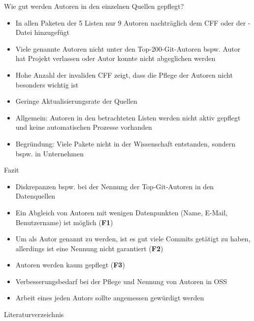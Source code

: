 \documentclass[%
    handout,
    aspectratio=1610,
    10pt,
    onlytextwidth, %
]{beamer}
\begin{document}
\begin{frame}{Wie gut werden Autoren in den einzelnen Quellen gepflegt?}
    \begin{itemize}
        \item In allen Paketen der 5 Listen nur 9 Autoren nachträglich dem CFF oder der -Datei hinzugefügt
        \item Viele genannte Autoren nicht unter den Top-200-Git-Autoren bspw. Autor hat Projekt verlassen oder Autor konnte nicht abgeglichen werden
        \item Hohe Anzahl der invaliden CFF zeigt, dass die Pflege der Autoren nicht besonders wichtig ist
        \item Geringe Aktualisierungsrate der Quellen
        \item Allgemein: Autoren in den betrachteten Listen werden nicht aktiv gepflegt und keine automatischen Prozesse vorhanden
        \item Begründung: Viele Pakete nicht in der Wissenschaft entstanden, sondern bspw. in Unternehmen %
    \end{itemize}
\end{frame}

\begin{frame}{Fazit}
    \begin{itemize}
        \item Diskrepanzen bspw. bei der Nennung der Top-Git-Autoren in den Datenquellen
        \item Ein Abgleich von Autoren mit wenigen Datenpunkten (Name, E-Mail, Benutzername) ist möglich (\textcolor{links}{\textbf{F1}})
        \item Um als Autor genannt zu werden, ist es gut viele Commits getätigt zu haben, allerdings ist eine Nennung nicht garantiert (\textcolor{links}{\textbf{F2}})
        \item Autoren werden kaum gepflegt (\textcolor{links}{\textbf{F3}})
        \item Verbesserungsbedarf bei der Pflege und Nennung von Autoren in OSS
        \item Arbeit eines jeden Autors sollte angemessen gewürdigt werden
    \end{itemize}
\end{frame}

\begin{frame}{Literaturverzeichnis}
    \printbibliography
\end{frame}

\end{document}
